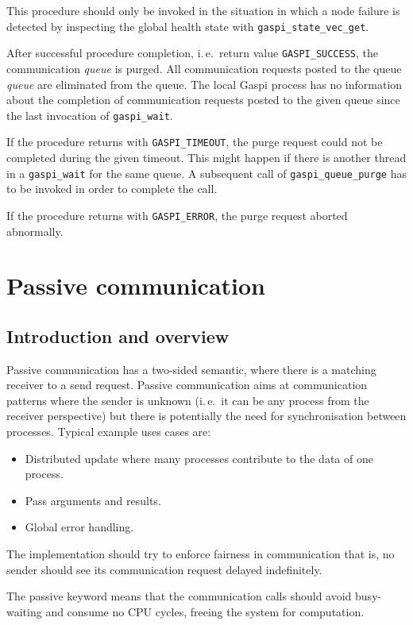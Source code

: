 \documentclass[a4paper]{article}
\newlength{\st}\setlength{\st}{0pt}
\newcommand{\zsep}[1]{#1}
\newcommand{\gaspiprefix}{gaspi}
\newcommand{\GASPI}{{\sc Gaspi}}
\newcommand{\function}[1]{{\tt #1}}
\newcommand{\parameter}[1]{{\it #1}}
\newcommand{\gaspifunction}[1]{\function{\protect\zsep{\gaspiprefix\_#1}}}
\newcommand{\GASPISUCC}{{\tt\protect\zsep{GASPI\_SUCCESS}}}
\newcommand{\GASPITIME}{{\tt\protect\zsep{GASPI\_TIMEOUT}}}
\newcommand{\GASPIGERR}{{\tt\protect\zsep{GASPI\_ERROR}}}
\begin{document}
This procedure should only be invoked in the situation in which a node failure is detected
by inspecting the global health state with \gaspifunction{state\_vec\_get}.

After successful procedure completion, i.\,e.\ return value \GASPISUCC{}, the communication
\parameter{queue} is purged. All communication requests posted to the queue \parameter{queue} are
eliminated from the queue. The local \GASPI{} process has no information about the
completion of communication requests posted to the given queue since the last invocation
of \gaspifunction{wait}.

If the procedure returns with \GASPITIME{}, the purge request could not be completed
during the given timeout. This might happen if there is another thread in a \gaspifunction{wait}
for the same queue. A subsequent call of \gaspifunction{queue\_purge} has to be
invoked in order to complete the call.

If the procedure returns with \GASPIGERR{}, the purge request aborted abnormally.

\section{Passive communication}

\subsection{Introduction and overview}

Passive communication has a two-sided semantic, where there is a
matching receiver to a send request. Passive communication aims at
communication patterns where the sender is unknown (i.\,e.\ it can be any
process from the receiver perspective) but there is potentially the need
for synchronisation between processes. Typical example uses cases are:

\begin{itemize}
\item Distributed update where many processes contribute to the data of
  one process.
\item Pass arguments and results.
\item Global error handling.
\end{itemize}

The implementation should try to enforce fairness in communication
that is, no sender should see its communication request delayed
indefinitely.

The passive keyword means that the communication calls should avoid
busy-waiting and consume no CPU cycles, freeing the system for
computation.
\end{document}
